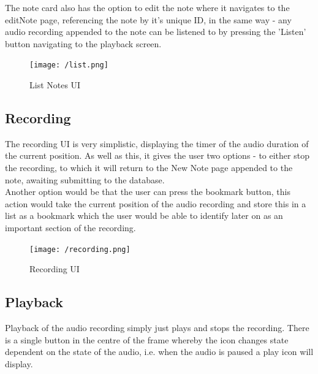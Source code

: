 \documentclass[oneside]{report}
\begin{document}
The note card also has the option to edit the note where it navigates to the editNote page, referencing the note by it's unique ID, in the same way - any audio recording appended to the note can be listened to by pressing the 'Listen' button navigating to the playback screen.\\
		
		\begin{figure}[H]
			\begin{center}
	 		 	\texttt{[image: /list.png]}
			\end{center}
			\caption[List Notes UI]{List Notes UI}
		\end{figure}


		\subsection{Recording}
		The recording UI is very simplistic, displaying the timer of the audio duration of the current position. As well as this, it gives the user two options - to either stop the recording, to which it will return to the New Note page appended to the note, awaiting submitting to the database.\\

Another option would be that the user can press the bookmark button, this action would take the current position of the audio recording and store this in a list as a bookmark which the user would be able to identify later on as an important section of the recording.

			\begin{figure}[H]
				\begin{center}
		 		 	\texttt{[image: /recording.png]}
				\end{center}
				\caption[Recording UI]{Recording UI}
			\end{figure}


		\subsection{Playback}
		Playback of the audio recording simply just plays and stops the recording. There is a single button in the centre of the frame whereby the icon changes state dependent on the state of the audio, i.e. when the audio is paused a play icon will display.\\
\end{document}
